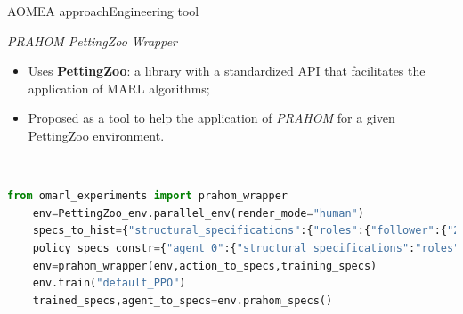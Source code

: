 \begin{frame}[fragile]{AOMEA approach}{Engineering tool}

    \begin{block}{\emph{PRAHOM PettingZoo Wrapper}\label{PettingZoo-wrapper}}
        \begin{itemize}
            \item Uses \textbf{PettingZoo}: a library with a standardized API that facilitates the application of MARL algorithms;
            \item Proposed as a tool to help the application of \emph{PRAHOM} for a given PettingZoo environment.
        \end{itemize}
    \end{block}

    \

    \begin{lstlisting}[language=Python, caption=PRAHOM PettingZoo Wrapper basic use, label={lst:wrapper_basic_use}]
    from omarl_experiments import prahom_wrapper
    env=PettingZoo_env.parallel_env(render_mode="human")
    specs_to_hist={"structural_specifications":{"roles":{"follower":{"23":41,"14":[74,0]}}...},"functional_specifications":{"links":{"(leader,follower,aut)":".*14.*?89"}...}...}
    policy_specs_constr={"agent_0":{"structural_specifications":"roles":["follower"]}}
    env=prahom_wrapper(env,action_to_specs,training_specs)
    env.train("default_PPO")
    trained_specs,agent_to_specs=env.prahom_specs()
    \end{lstlisting}

\end{frame}
